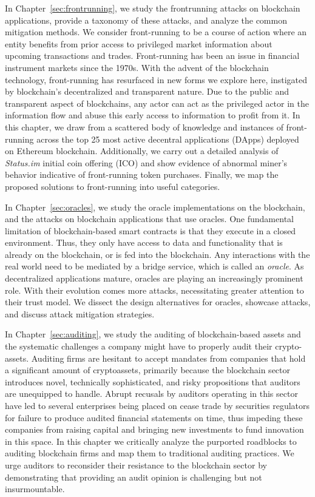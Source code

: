 In Chapter~\ref{sec:frontrunning}, we study the frontrunning attacks on blockchain applications, provide a taxonomy of these attacks, and analyze the common mitigation methods. We consider front-running to be a course of action where an entity benefits from prior access to privileged market information about upcoming transactions and trades. Front-running has been an issue in financial instrument markets since the 1970s. With the advent of the blockchain technology, front-running has resurfaced in new forms we explore here, instigated by blockchain’s decentralized and transparent nature. Due to the public and transparent aspect of blockchains, any actor can act as the privileged actor in the information flow and abuse this early access to information to profit from it. In this chapter, we draw from a scattered body of knowledge and instances of front-running across the top 25 most active decentral applications (DApps) deployed on Ethereum blockchain. Additionally, we carry out a detailed analysis of \textit{Status.im} initial coin offering (ICO) and show evidence of abnormal miner’s behavior indicative of front-running token purchases. Finally, we map the proposed solutions to front-running into useful categories.


In Chapter~\ref{sec:oracles}, we study the oracle implementations on the blockchain, and the attacks on blockchain applications that use oracles. One fundamental limitation of blockchain-based smart contracts is that they execute in a closed environment. Thus, they only have access to data and functionality that is already on the blockchain, or is fed into the blockchain. Any interactions with the real world need to be mediated by a bridge service, which is called an \textit{oracle}. As decentralized applications mature, oracles are playing an increasingly prominent role. With their evolution comes more attacks, necessitating greater attention to their trust model. We dissect the design alternatives for oracles, showcase attacks, and discuss attack mitigation strategies.


In Chapter~\ref{sec:auditing}, we study the auditing of blockchain-based assets and the systematic challenges a company might have to properly audit their crypto-assets. Auditing firms are hesitant to accept mandates from companies that hold a significant amount of cryptoassets, primarily because the blockchain sector introduces novel, technically sophisticated, and risky propositions that auditors are unequipped to handle. Abrupt recusals by auditors operating in this sector have led to several enterprises being placed on cease trade by securities regulators for failure to produce audited financial statements on time, thus impeding these companies from raising capital and bringing new investments to fund innovation in this space. In this chapter we critically analyze the purported roadblocks to auditing blockchain firms and map them to traditional auditing practices. We urge auditors to reconsider their resistance to the blockchain sector by demonstrating that providing an audit opinion is challenging but not insurmountable.


